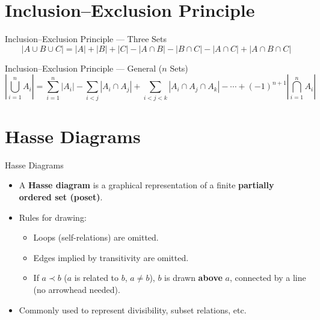 \documentclass[10pt]{beamer}
\begin{document}
\section{Inclusion--Exclusion Principle}
\begin{frame}{Inclusion--Exclusion Principle --- Three Sets}
  \[
    |A \cup B \cup C| = |A|+|B|+|C| - |A\cap B| - |B\cap C| - |A\cap C| + |A\cap B\cap C|
  \]
\end{frame}

\begin{frame}{Inclusion--Exclusion Principle --- General ($n$ Sets)}
  \[
    \left| \bigcup_{i=1}^{n} A_i \right|
    = \sum_{i=1}^{n} |A_i|
    - \sum_{i<j} |A_i \cap A_j|
    + \sum_{i<j<k} |A_i \cap A_j \cap A_k|
    - \cdots
    + (-1)^{n+1} \left| \bigcap_{i=1}^{n} A_i \right|
  \]
\end{frame}

\section{Hasse Diagrams}
\begin{frame}{Hasse Diagrams}
  \small
  \begin{itemize}
    \item A \textbf{Hasse diagram} is a graphical representation of a finite \textbf{partially ordered set (poset)}.
    \item Rules for drawing:
    \begin{itemize}
      \item Loops (self-relations) are omitted.
      \item Edges implied by transitivity are omitted.
      \item If $a \prec b$ ($a$ is related to $b$, $a \neq b$), $b$ is drawn \textbf{above} $a$, connected by a line (no arrowhead needed).
    \end{itemize}
    \item Commonly used to represent divisibility, subset relations, etc.
  \end{itemize}
\end{frame}
\end{document}
